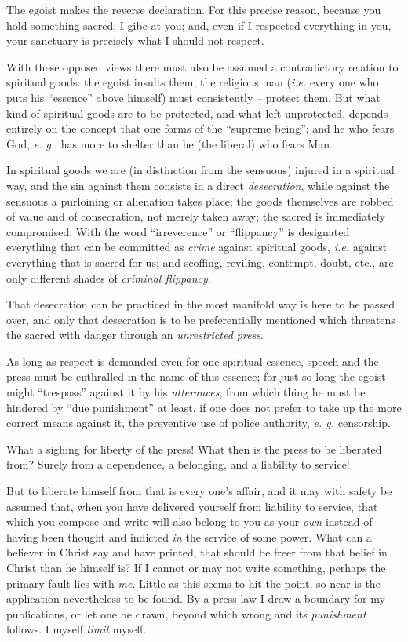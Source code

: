 \documentclass[12pt,a4paper]{book}
\begin{document}
The egoist makes the reverse declaration. For this precise reason, because you 
hold something sacred, I gibe at you; and, even if I respected everything in 
you, your sanctuary is precisely what I should not respect.

With these opposed views there must also be assumed a contradictory relation 
to spiritual goods: the egoist insults them, the religious man (\textit{i.e.} 
every one who puts his ``essence'' above himself) must consistently -- 
protect them. But what kind of spiritual goods are to be protected, and what 
left unprotected, depends entirely on the concept that one forms of the 
``supreme being''; and he who fears God, \textit{e. g.}, has more to shelter 
than he (the liberal) who fears Man.

In spiritual goods we are (in distinction from the sensuous) injured in a 
spiritual way, and the sin against them consists in a direct 
\textit{desecration}, while against the sensuous a purloining or alienation 
takes place; the goods themselves are robbed of value and of consecration, not 
merely taken away; the sacred is immediately compromised. With the word 
``irreverence'' or ``flippancy'' is designated everything that can be 
committed as \textit{crime} against spiritual goods, \textit{i.e.} against 
everything that is sacred for us; and scoffing, reviling, contempt, doubt, 
etc., are only different shades of \textit{criminal flippancy}.

That desecration can be practiced in the most manifold way is here to be 
passed over, and only that desecration is to be preferentially mentioned which 
threatens the sacred with danger through an \textit{unrestricted press}.

As long as respect is demanded even for one spiritual essence, speech and the 
press must be enthralled in the name of this essence; for just so long the 
egoist might ``trespass'' against it by his \textit{utterances}, from which 
thing he must be hindered by ``due punishment'' at least, if one does not 
prefer to take up the more correct means against it, the preventive use of 
police authority, \textit{e. g.} censorship.

What a sighing for liberty of the press! What then is the press to be 
liberated from? Surely from a dependence, a belonging, and a liability to 
service!

But to liberate himself from that is every one's affair, and it may with 
safety be assumed that, when you have delivered yourself from liability to 
service, that which you compose and write will also belong to you as your 
\textit{own} instead of having been thought and indicted \textit{in} the 
service of some power. What can a believer in Christ say and have printed, 
that should be freer from that belief in Christ than he himself is? If I 
cannot or may not write something, perhaps the primary fault lies with 
\textit{me}. Little as this seems to hit the point, so near is the application 
nevertheless to be found. By a press-law I draw a boundary for my 
publications, or let one be drawn, beyond which wrong and its 
\textit{punishment} follows. I myself \textit{limit} myself.
\end{document}
